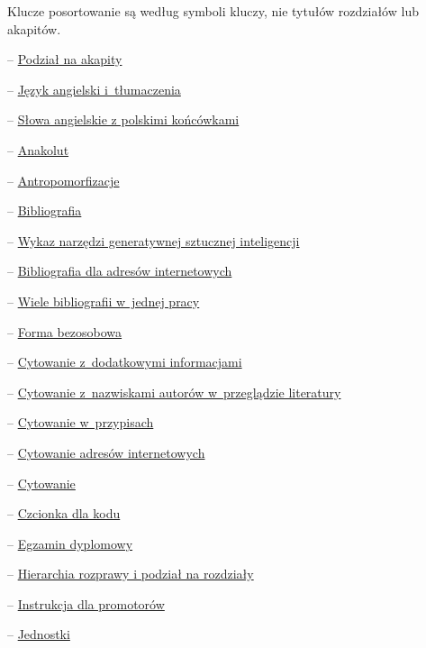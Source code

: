 Klucze posortowanie są według symboli kluczy, nie tytułów rozdziałów lub akapitów.
\begin{description}
  \item{} -- \hyperref[sec:dod:akapity]{Podział na akapity}
  \item{} -- \hyperref[sec:dod:jezyk-ang]{Język angielski i~tłumaczenia}
  \item{} -- \hyperref[sec:dod:jezyk-ang-polskie-koncowki]{Słowa angielskie z polskimi końcówkami}
  \item{} -- \hyperref[sec:dod:anakolut]{Anakolut}
  \item{} -- \hyperref[sec:dod:antropomirfizacje]{Antropomorfizacje}
  \item{} -- \hyperref[sec:dod:bibliografia]{Bibliografia}
  \item{} -- \hyperref[sec:dod:bibliografia-SI]{Wykaz narzędzi generatywnej sztucznej inteligencji}
  \item{} -- \hyperref[sec:dod:bibliografia-url]{Bibliografia dla adresów internetowych}
  \item{} -- \hyperref[sec:dod:bibliografia-wiele]{Wiele bibliografii w~jednej pracy}
  \item{} -- \hyperref[sec:dod:bezosobowo]{Forma bezosobowa}
  \item{} -- \hyperref[sec:dod:cytowanie-dodatkowe-informacje]{Cytowanie z~dodatkowymi informacjami}
  \item{} -- \hyperref[sec:dod:cytowanie-nazwiska-przeglad]{Cytowanie z~nazwiskami autorów w~przeglądzie literatury}
  \item{} -- \hyperref[sec:dod:cytowanie-przypisy]{Cytowanie w~przypisach}
  \item{} -- \hyperref[sec:dod:cytowanie-url]{Cytowanie adresów internetowych}
  \item{} -- \hyperref[sec:dod:cytowanie]{Cytowanie}
  \item{} -- \hyperref[sec:dod:czcionka-kodu]{Czcionka dla kodu}
  \item{} -- \hyperref[sec:dod:egzamin]{Egzamin dyplomowy}
  \item{} -- \hyperref[sec:dod:hierarchia]{Hierarchia rozprawy i podział na rozdziały}
  \item{} -- \hyperref[sec:dod:instrukcja-promotorzy]{Instrukcja dla promotorów}
  \item{} -- \hyperref[sec:dod:jednostki]{Jednostki}

\end{description}
